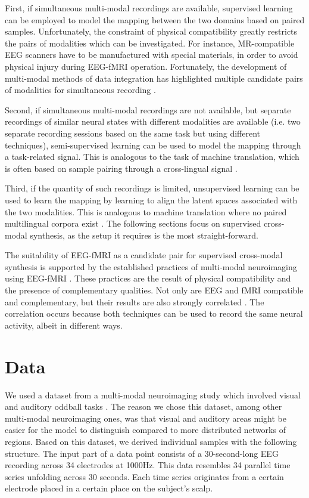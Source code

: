 \documentclass{article}
\begin{document}
First, if simultaneous multi-modal recordings are available, supervised learning can be employed to model the mapping between the two domains based on paired samples. Unfortunately, the constraint of physical compatibility greatly restricts the pairs of modalities which can be investigated. For instance, MR-compatible EEG scanners have to be manufactured with special materials, in order to avoid physical injury during EEG-fMRI operation. Fortunately, the development of multi-modal methods of data integration has highlighted multiple candidate pairs of modalities for simultaneous recording \cite{yi_generative_2019}.

Second, if simultaneous multi-modal recordings are not available, but separate recordings of similar neural states with different modalities are available (i.e. two separate recording sessions based on the same task but using different techniques), semi-supervised learning can be used to model the mapping through a task-related signal. This is analogous to the task of machine translation, which is often based on sample pairing through a cross-lingual signal \cite{zhang_neural_2020}.

Third, if the quantity of such recordings is limited, unsupervised learning can be used to learn the mapping by learning to align the latent spaces associated with the two modalities. This is analogous to machine translation where no paired multilingual corpora exist \cite{lample_phrase-based_2018}. The following sections focus on supervised cross-modal synthesis, as the setup it requires is the most straight-forward.

The suitability of EEG-fMRI as a candidate pair for supervised cross-modal synthesis is supported by the established practices of multi-modal neuroimaging using EEG-fMRI \cite{huster_methods_2012}. These practices are the result of physical compatibility and the presence of complementary qualities. Not only are EEG and fMRI compatible and complementary, but their results are also strongly correlated \cite{ostwald_eeg-fmri_2009}. The correlation occurs because both techniques can be used to record the same neural activity, albeit in different ways.

\section{Data}

We used a dataset from a multi-modal neuroimaging study which involved visual and auditory oddball tasks \cite{noauthor_auditory_nodate}. The reason we chose this dataset, among other multi-modal neuroimaging ones, was that visual and auditory areas might be easier for the model to distinguish compared to more distributed networks of regions. Based on this dataset, we derived individual samples with the following structure. The input part of a data point consists of a 30-second-long EEG recording across 34 electrodes at 1000Hz. This data resembles 34 parallel time series unfolding across 30 seconds. Each time series originates from a certain electrode placed in a certain place on the subject's scalp.
\end{document}
